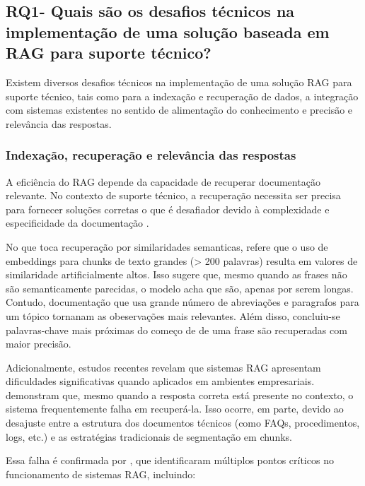 \subsection{RQ1- Quais são os desafios técnicos na implementação de uma solução baseada em RAG para suporte técnico?}

Existem diversos desafios técnicos na implementação de uma solução RAG para suporte técnico, tais como para a indexação e recuperação de dados, a integração com sistemas existentes no sentido de alimentação do conhecimento e precisão e relevância das respostas. 

\subsubsection{Indexação, recuperação e relevância das respostas}

A eficiência do RAG depende da capacidade de recuperar documentação relevante. No contexto de suporte técnico, a recuperação necessita ser precisa para fornecer soluções corretas o que é desafiador devido à complexidade e especificidade da documentação \parencite{ToroIsaza2024}.


No que toca recuperação por similaridades semanticas, \cite{soman2024observations} refere que o uso de embeddings para chunks de texto grandes (> 200 palavras) resulta em valores de similaridade artificialmente altos. Isso sugere que, mesmo quando as frases não são semanticamente parecidas, o modelo acha que são, apenas por serem longas. Contudo, documentação que usa grande número de abreviações e paragrafos para um tópico tornanam as obeservações mais relevantes. Além disso, concluiu-se palavras-chave mais próximas do começo de de uma frase são recuperadas com maior precisão.

Adicionalmente, estudos recentes revelam que sistemas RAG apresentam dificuldades significativas quando aplicados em ambientes empresariais. \textcite{RAGDoesNotWork2024} demonstram que, mesmo quando a resposta correta está presente no contexto, o sistema frequentemente falha em recuperá-la. Isso ocorre, em parte, devido ao desajuste entre a estrutura dos documentos técnicos (como FAQs, procedimentos, logs, etc.) e as estratégias tradicionais de segmentação em chunks.

Essa falha é confirmada por \textcite{SevenPoints2024}, que identificaram múltiplos pontos críticos no funcionamento de sistemas RAG, incluindo:


